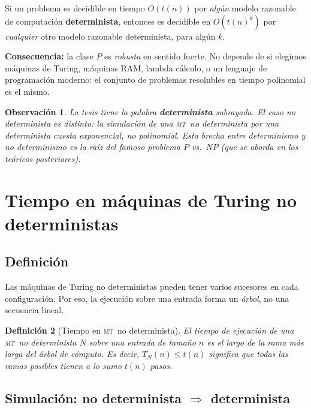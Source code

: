 \documentclass[11pt,a4paper]{article}
\theoremstyle{definicion}
\newtheorem{definicion}{Definición}[section]
\newtheorem{observacion}[definicion]{Observación}
\newcommand{\MT}{\textsc{mt}}
\begin{document}
\begin{tcolorbox}[colback=yellow!10!white, colframe=orange!70!black, title=\textbf{Tesis de Church-Turing Extendida}, fonttitle=\bfseries]
Si un problema es decidible en tiempo $O(t(n))$ por \emph{algún} modelo razonable de computación \textbf{determinista}, entonces es decidible en $O(t(n)^k)$ por \emph{cualquier} otro modelo razonable determinista, para algún $k$.
\end{tcolorbox}

\textbf{Consecuencia:} la clase $P$ es \emph{robusta} en sentido fuerte. No depende de si elegimos máquinas de Turing, máquinas RAM, lambda cálculo, o un lenguaje de programación moderno: el conjunto de problemas resolubles en tiempo polinomial es el mismo.

\begin{observacion}
La tesis tiene la palabra \textbf{determinista} subrayada. El caso \emph{no determinista} es distinto: la simulación de una \MT\ no determinista por una determinista cuesta \emph{exponencial}, no polinomial. Esta brecha entre determinismo y no determinismo es la raíz del famoso problema $P$ vs.\ $NP$ (que se aborda en los teóricos posteriores).
\end{observacion}

\section{Tiempo en máquinas de Turing no deterministas}

\subsection{Definición}

Las máquinas de Turing no deterministas pueden tener varios sucesores en cada configuración. Por eso, la ejecución sobre una entrada forma un \emph{árbol}, no una secuencia lineal.

\begin{definicion}[Tiempo en \MT\ no determinista]
El tiempo de ejecución de una \MT\ no determinista $N$ sobre una entrada de tamaño $n$ es el largo de la rama \emph{más larga} del árbol de cómputo. Es decir, $T_N(n) \leq t(n)$ significa que \emph{todas} las ramas posibles tienen a lo sumo $t(n)$ pasos.
\end{definicion}

\subsection{Simulación: no determinista $\Rightarrow$ determinista}
\end{document}
